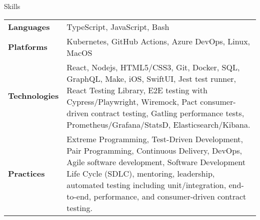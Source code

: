 \begin{section}{Skills}
  \begin{tabularx}{\linewidth}{@{}l X@{}}
    \textbf{Languages} &\small{TypeScript, JavaScript, Bash} \\
    \textbf{Platforms} &\small{Kubernetes, GitHub Actions, Azure DevOps, Linux, MacOS} \\
    \textbf{Technologies} &\small{React, Nodejs, HTML5/CSS3, Git, Docker, SQL, GraphQL, Make, iOS, SwiftUI, Jest test runner, React Testing Library, E2E testing with Cypress/Playwright, Wiremock, Pact consumer-driven contract testing, Gatling performance tests, Prometheus/Grafana/StatsD, Elasticsearch/Kibana.} \\
    \textbf{Practices} &\small{Extreme Programming, Test-Driven Development, Pair Programming, Continuous Delivery, DevOps, Agile software development, Software Development Life Cycle (SDLC), mentoring, leadership, automated testing including unit/integration, end-to-end, performance, and consumer-driven contract testing.} \\
  \end{tabularx}
\end{section}
